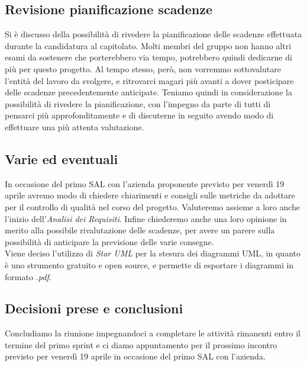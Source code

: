 \documentclass[italian,12pt]{article}
\begin{document}
\subsection{Revisione pianificazione scadenze}
Si è discusso della possibilità di rivedere la pianificazione delle scadenze effettuata durante la candidatura al capitolato. Molti membri del gruppo non hanno altri esami da sostenere che porterebbero via tempo, potrebbero quindi dedicarne di più per questo progetto. Al tempo stesso, però, non vorremmo sottovalutare l'entità del lavoro da svolgere, e ritrovarci magari più avanti a dover posticipare delle scadenze precedentemente anticipate. Teniamo quindi in considerazione la possibilità di rivedere la pianificazione, con l'impegno da parte di tutti di pensarci più approfonditamente e di discuterne in seguito avendo modo di effettuare una più attenta valutazione.

\subsection{Varie ed eventuali}
In occasione del primo SAL con l'azienda proponente previsto per venerdì 19 aprile avremo modo di chiedere chiarimenti e consigli sulle metriche da adottare per il controllo di qualità nel corso del progetto. Valuteremo assieme a loro anche l'inizio dell'\textit{Analisi dei Requisiti}. Infine chiederemo anche una loro opinione in merito alla possibile rivalutazione delle scadenze, per avere un parere sulla possibilità di anticipare la previsione delle varie consegne. \\
Viene deciso l'utilizzo di \textit{Star UML} per la stesura dei diagrammi UML, in quanto è uno strumento gratuito e open source, e permette di esportare i diagrammi in formato \textit{.pdf}.

\subsection{Decisioni prese e conclusioni}
Concludiamo la riunione impegnandoci a completare le attività rimanenti entro il termine del primo sprint e ci diamo appuntamento per il prossimo incontro previsto per venerdì 19 aprile in occasione del primo SAL con l'azienda.
\end{document}
